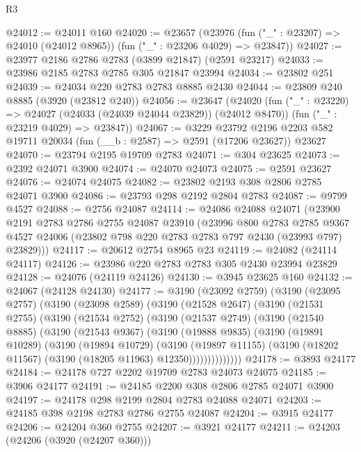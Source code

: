 \begin{lexlean}{R3}
\begin{coremodule}
@24012 := @24011 @160
@24020 := @23657
    (@23976 (fun ("_" : @23207) => @24010 (@24012 @8965)) (fun ("_" : @23206 @4029) => @23847))
@24027 := @23977 @2186 @2786 @2783 (@3899 @21847) (@2591 @23217)
@24033 := @23986 @2185 @2783 @2785 @305 @21847 @23994
@24034 := @23802 @251
@24039 := @24034 @220 @2783 @2783 @8885 @2430
@24044 := @23809 @240 @8885 (@3920 (@23812 @240))
@24056 := @23647
    (@24020
      (fun ("_" : @23220) => @24027 (@24033 (@24039 @24044 @23829)) (@24012 @8470))
      (fun ("_" : @23219 @4029) => @23847))
@24067 := @3229
    @23792
    @2196
    @2203
    @582
    @19711
    @20034
    (fun (__b : @2587) => @2591 (@17206 @23627))
    @23627
@24070 := @23794 @2195 @19709 @2783
@24071 := @304 @23625
@24073 := @2392 @24071 @3900
@24074 := @24070 @24073
@24075 := @2591 @23627
@24076 := @24074 @24075
@24082 := @23802 @2193 @308 @2806 @2785 @24071 @3900
@24086 := @23793 @298 @2192 @2804 @2783
@24087 := @9799 @4527
@24088 := @2756 @24087
@24114 := @24086
    @24088
    @24071
    (@23900
      @2191
      @2783
      @2786
      @2755
      @24087
      @23910
      (@23996
        @800
        @2783
        @2785
        @9367
        @4527
        @24006
        (@23802 @798 @220 @2783 @2783 @797 @2430 (@23993 @797) @23829)))
@24117 := @20612 @2754 @8965 @23
@24119 := @24082 (@24114 @24117)
@24126 := @23986 @220 @2783 @2783 @305 @2430 @23994 @23829
@24128 := @24076 (@24119 @24126)
@24130 := @3945 @23625 @160
@24132 := @24067 (@24128 @24130)
@24177 := @3190
    (@23092 @2759)
    (@3190
      (@23095 @2757)
      (@3190
        (@23098 @2589)
        (@3190
          (@21528 @2647)
          (@3190
            (@21531 @2755)
            (@3190
              (@21534 @2752)
              (@3190
                (@21537 @2749)
                (@3190
                  (@21540 @8885)
                  (@3190
                    (@21543 @9367)
                    (@3190
                      (@19888 @9835)
                      (@3190
                        (@19891 @10289)
                        (@3190
                          (@19894 @10729)
                          (@3190
                            (@19897 @11155)
                            (@3190 (@18202 @11567) (@3190 (@18205 @11963) @12350))))))))))))))
@24178 := @3893 @24177
@24184 := @24178 @727 @2202 @19709 @2783 @24073 @24075
@24185 := @3906 @24177
@24191 := @24185 @2200 @308 @2806 @2785 @24071 @3900
@24197 := @24178 @298 @2199 @2804 @2783 @24088 @24071
@24203 := @24185 @398 @2198 @2783 @2786 @2755 @24087
@24204 := @3915 @24177
@24206 := @24204 @360 @2755
@24207 := @3921 @24177
@24211 := @24203 (@24206 (@3920 (@24207 @360)))

\end{coremodule}
\end{lexlean}
